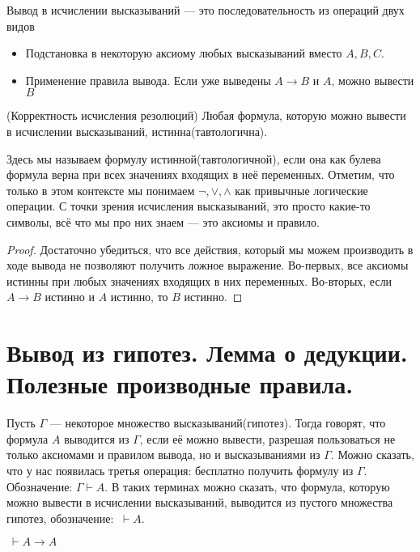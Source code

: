\documentclass{article}
\begin{document}
Вывод в исчислении высказываний --- это последовательность из операций двух видов
\begin{itemize}
	\item Подстановка в некоторую аксиому любых высказываний вместо $A, B, C$.
	\item Применение правила вывода. Если уже выведены $A\to B$ и $A$, можно вывести $B$
\end{itemize}

\begin{theorem}{(Корректность исчисления резолюций)}
	Любая формула, которую можно вывести в исчислении высказываний, истинна(тавтологична).
\end{theorem}
Здесь мы называем формулу истинной(тавтологичной), если она как булева формула верна при всех значениях входящих в неё переменных. Отметим, что только в этом контексте мы понимаем $\lnot, \lor, \land$ как привычные логические операции. С точки зрения исчисления высказываний, это просто какие-то символы, всё что мы про них знаем --- это аксиомы и правило.
\begin{proof}
	Достаточно убедиться, что все действия, который мы можем производить в ходе вывода не позволяют получить ложное выражение. Во-первых, все аксиомы истинны при любых значениях входящих в них переменных. Во-вторых, если $A \to B$ истинно и $A$ истинно, то $B$ истинно.
\end{proof}

\section{Вывод из гипотез. Лемма о дедукции. Полезные производные правила.}
Пусть $\Gamma$ --- некоторое множество высказываний(гипотез). Тогда говорят, что формула $A$ выводится из $\Gamma$, если её можно вывести,  разрешая пользоваться не только аксиомами и правилом вывода, но и высказываниями из $\Gamma$. Можно сказать, что у нас появилась третья операция: бесплатно получить формулу из $\Gamma$. Обозначение: $\Gamma \vdash A$. В таких терминах можно сказать, что формула, которую можно вывести в исчислении высказываний,  выводится из пустого множества гипотез, обозначение: $\ \vdash A$.

\begin{lemma}
	$\ \vdash A \to A$
\end{lemma}
\end{document}
